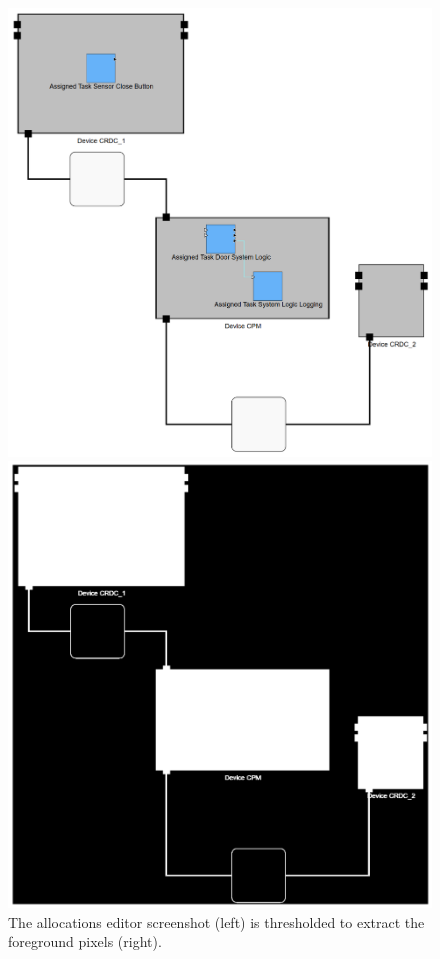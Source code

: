 \begin{figure}[htb]
    \centering
    \begin{minipage}[b]{0.36\textwidth}
        \includegraphics[width=\textwidth]{pictures/foreground_threshold_before.png}
    \end{minipage}
    \hfill
    \begin{minipage}[b]{0.36\textwidth}
        \includegraphics[width=\textwidth]{pictures/foreground_threshold_after.png}
    \end{minipage}
    \caption{The allocations editor screenshot (left) is thresholded to extract the foreground pixels (right).}
    \label{fig:foreground_threshold}
\end{figure}\\
